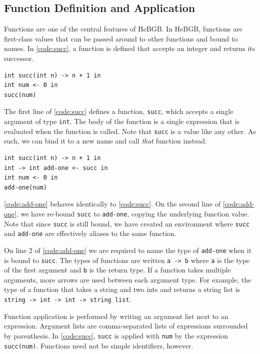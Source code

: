 \documentclass[12pt]{article}
\begin{document}
\subsection{Function Definition and Application}
Functions are one of the central features of HeBGB. In HeBGB, functions
are first-class values that can be passed around to other functions
and bound to names. In \ref{code:succ}, a function is defined that
accepts an integer and returns its successor.
\begin{code_box}
\label{code:succ}
\begin{lstlisting}[language=HeBGB]
int succ(int n) -> n + 1 in
int num <- 0 in
succ(num)
\end{lstlisting}
\end{code_box}
The first line of \ref{code:succ} defines a function, \texttt{succ},
which accepts a single argument of type \texttt{int}. The body
of the function is a single expression that is evaluated when the
function is called. Note that \texttt{succ} is a value like any other.
As such, we can bind it to a new name and call \textit{that} function
instead.
\begin{code_box}
\label{code:add-one}
\begin{lstlisting}[language=HeBGB]
int succ(int n) -> n + 1 in
int -> int add-one <- succ in
int num <- 0 in
add-one(num)
\end{lstlisting}
\end{code_box}
\ref{code:add-one} behaves identically to \ref{code:succ}. On the
second line of \ref{code:add-one}, we have re-bound \texttt{succ} to
\texttt{add-one}, copying the underlying function value. Note that
since \texttt{succ} is still bound, we have created an environment where
\texttt{succ} and \texttt{add-one} are effectively aliases to the same
function.

On line 2 of \ref{code:add-one} we are required to name the type
of \texttt{add-one} when it is bound to \texttt{succ}. The types
of functions are written \texttt{a -> b} where \texttt{a} is the
type of the first argument and \texttt{b} is the return type. If a
function takes multiple arguments, more arrows are used between each
argument type. For example, the type of a function that takes a
string and two ints and returns a string list is
\texttt{string -> int -> int -> string list}.

Function application is performed by writing an argument list next
to an expression. Argument lists are comma-separated lists of expressions
surrounded by parenthesis. In \ref{code:succ}, \texttt{succ} is applied
with \texttt{num} by the expression \texttt{succ(num)}. Functions need
not be simple identifiers, however.
\end{document}
